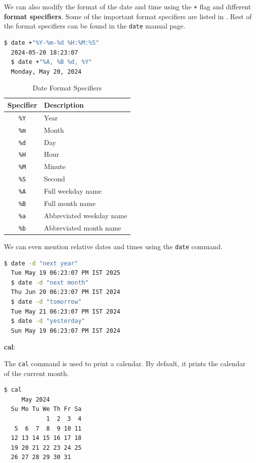 We can also modify the format of the date and time using the \texttt{+} flag and different \textbf{format specifiers}.
Some of the important format specifiers are listed in .
Rest of the format specifiers can be found in the \texttt{date} manual page.

\begin{lstlisting}[language=bash]
  $ date +"%Y-%m-%d %H:%M:%S"
  2024-05-20 18:23:07
  $ date +"%A, %B %d, %Y"
  Monday, May 20, 2024
\end{lstlisting}

\begin{table}[h]
\caption{Date Format Specifiers}
\begin{tabular}{ c l }
  \toprule
 Specifier & Description \\
 \midrule
  \texttt{\%Y} & Year \\
  \texttt{\%m} & Month \\
  \texttt{\%d} & Day \\
  \texttt{\%H} & Hour \\
  \texttt{\%M} & Minute \\
  \texttt{\%S} & Second \\
  \texttt{\%A} & Full weekday name \\
  \texttt{\%B} & Full month name \\
  \texttt{\%a} & Abbreviated weekday name \\
  \texttt{\%b} & Abbreviated month name \\
  \bottomrule
\end{tabular}
\end{table}

We can even mention relative dates and times using the \texttt{date} command.

\begin{lstlisting}[language=bash]
  $ date -d "next year"
  Tue May 19 06:23:07 PM IST 2025
  $ date -d "next month"
  Thu Jun 20 06:23:07 PM IST 2024
  $ date -d "tomorrow"
  Tue May 21 06:23:07 PM IST 2024
  $ date -d "yesterday"
  Sun May 19 06:23:07 PM IST 2024
\end{lstlisting}

\textbf{cal}:

The \texttt{cal} command is used to print a calendar.
By default, it prints the calendar of the current month.

\begin{lstlisting}[language=bash]
  $ cal
     May 2024
  Su Mo Tu We Th Fr Sa
            1  2  3  4
   5  6  7  8  9 10 11
  12 13 14 15 16 17 18
  19 20 21 22 23 24 25
  26 27 28 29 30 31
\end{lstlisting}

